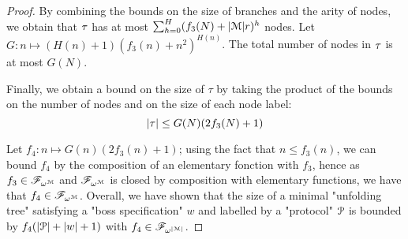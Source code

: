\begin{proof}
	
	By combining the bounds on the size of branches and the arity of nodes, we obtain that $\tau$ has at most $\sum_{h=0}^{H} (f_3(N) + |\mathcal{M}|r)^h$ nodes. Let $G: n \mapsto (H(n)+1)(f_3(n) + n^2)^{H(n)}$. The total number of nodes in $\tau$ is at most $G(N)$.
	
	Finally, we obtain a bound on the size of $\tau$ by taking the product of the bounds on the number of nodes and on the size of each node label: 
	\[ |\tau| \leq  G(N) (2 f_3(N)+1)\]
	
	Let $f_4: n \mapsto  G(n) (2 f_3(n) +1)$; using the fact that $n \leq f_3(n)$, we can bound $f_4$ by the composition of an elementary fonction with $f_3$, hence as $f_3 \in \mathscr{F}_{\omega^{\mathcal{M}}}$ and $\mathscr{F}_{\omega^{\mathcal{M}}}$ is closed by composition with elementary functions, we have that $f_4 \in \mathscr{F}_{\omega^{\mathcal{M}}}$.
	Overall, we have shown that the size of a minimal "unfolding tree" satisfying a "boss specification" $w$ and labelled by a "protocol" $\mathcal{P}$ is bounded by $f_4(|\mathcal{P}| + |w| +1)$ with $f_4 \in \mathscr{F}_{\omega^{|\mathcal{M}|}}$.
\end{proof}

